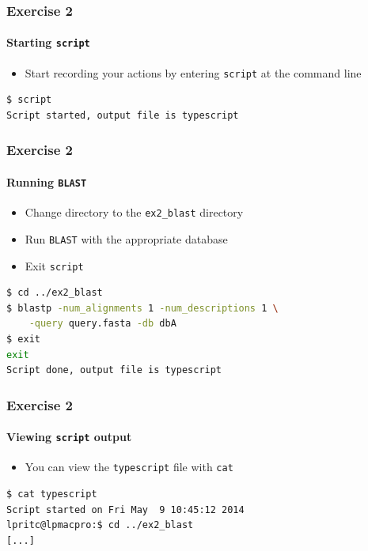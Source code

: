 \documentclass[table]{beamer}
\begin{document}
  \begin{frame}[fragile]
    \frametitle{Exercise 2}
    \framesubtitle{Starting \texttt{script}}    
    \begin{itemize}
      \item Start recording your actions by entering \texttt{script} at the command line      
    \end{itemize}
    \begin{lstlisting}[language=bash]
$ script
Script started, output file is typescript
    \end{lstlisting}    
\end{frame}

  \begin{frame}[fragile]
    \frametitle{Exercise 2}
    \framesubtitle{Running \texttt{BLAST}}
    \begin{itemize}
      \item Change directory to the \texttt{ex2\_blast} directory
      \item Run \texttt{BLAST} with the appropriate database
      \item Exit \texttt{script}
    \end{itemize}
    \begin{lstlisting}[language=bash]
$ cd ../ex2_blast
$ blastp -num_alignments 1 -num_descriptions 1 \
    -query query.fasta -db dbA
$ exit
exit
Script done, output file is typescript
    \end{lstlisting}    
\end{frame}

  \begin{frame}[fragile]
    \frametitle{Exercise 2}
    \framesubtitle{Viewing \texttt{script} output}
    \begin{itemize}
      \item You can view the \texttt{typescript} file with \texttt{cat}
    \end{itemize}
    \begin{lstlisting}[language=bash]
$ cat typescript
Script started on Fri May  9 10:45:12 2014
lpritc@lpmacpro:$ cd ../ex2_blast
[...]
    \end{lstlisting}    
\end{frame}
\end{document}
